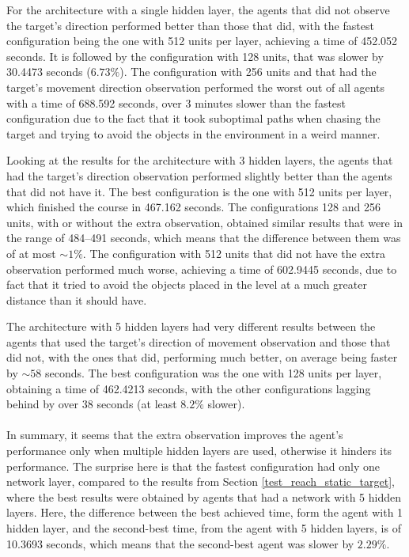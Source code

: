 For the architecture with a single hidden layer, the agents that did not observe the target's direction performed better than those that did, with the fastest configuration being the one with 512 units per layer, achieving a time of 452.052 seconds. It is followed by the configuration with 128 units, that was slower by 30.4473 seconds ($6.73\%$). The configuration with 256 units and that had the target's movement direction observation performed the worst out of all agents with a time of 688.592 seconds, over 3 minutes slower than the fastest configuration due to the fact that it took suboptimal paths when chasing the target and trying to avoid the objects in the environment in a weird manner.

Looking at the results for the architecture with 3 hidden layers, the agents that had the target's direction observation performed slightly better than the agents that did not have it. The best configuration is the one with 512 units per layer, which finished the course in 467.162 seconds. The configurations 128 and 256 units, with or without the extra observation, obtained similar results that were in the range of 484--491 seconds, which means that the difference between them was of at most $\sim1\%$. The configuration with 512 units that did not have the extra observation performed much worse, achieving a time of 602.9445 seconds, due to fact that it tried to avoid the objects placed in the level at a much greater distance than it should have.

The architecture with 5 hidden layers had very different results between the agents that used the target's direction of movement observation and those that did not, with the ones that did, performing much better, on average being faster by $\sim58$ seconds. The best configuration was the one with 128 units per layer, obtaining a time of 462.4213 seconds, with the other configurations lagging behind by over 38 seconds (at least $8.2\%$ slower).

\paragraph{}
In summary, it seems that the extra observation improves the agent's performance only when multiple hidden layers are used, otherwise it hinders its performance. The surprise here is that the fastest configuration had only one network layer, compared to the results from Section \ref{test_reach_static_target}, where the best results were obtained by agents that had a network with 5 hidden layers. Here, the difference between the best achieved time, form the agent with 1 hidden layer, and the second-best time, from the agent with 5 hidden layers, is of 10.3693 seconds, which means that the second-best agent was slower by $2.29\%$.

